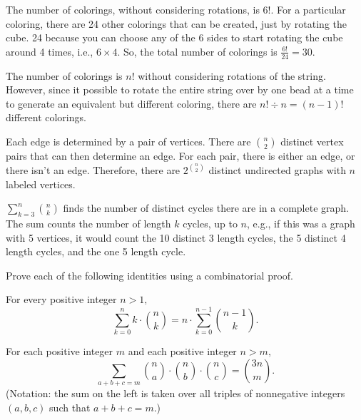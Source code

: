 \documentclass[11pt]{article}
\begin{document}
\begin{solution}
    \begin{Parts}

        \Part The number of colorings, without considering rotations, is $6!$. 
        For a particular coloring, there are 24 other colorings that can be 
        created, just by rotating the cube. 24 because you can choose any of the 
        6 sides to start rotating the cube around 4 times, i.e., $6 \times 4$. So,
        the total number of colorings is $\frac{6!}{24} = 30$.

        \Part The number of colorings is $n!$ without considering rotations of the
        string. However, since it possible to rotate the entire string over by one 
        bead at a time to generate an equivalent but different coloring, there are $n!
        \div n = (n-1)!$ different colorings.

        \Part Each edge is determined by a pair of vertices. There are 
        $\binom{n}{2}$ distinct vertex pairs that can then determine an edge. For 
        each pair, there is either an edge, or there isn't an edge. Therefore,
        there are $2^{\binom{n}{2}}$ distinct undirected graphs with $n$ labeled
        vertices. 

        \Part $\sum_{k=3}^{n} \binom{n}{k}$ finds the number of distinct cycles there 
        are in a complete graph. The sum counts the number of length $k$ cycles, 
        up to $n$, e.g., if this was a graph with 5 vertices, it would count the 10
        distinct 3 length cycles, the 5 distinct 4 length cycles, and the one 5 length
        cycle. 

    \end{Parts}
\end{solution}

Prove each of the following identities using a combinatorial proof.

\begin{Parts}

\Part For every positive integer $n>1,$ 
\[\sum_{k=0}^n k \cdot \binom{n}{k} = n\cdot \sum_{k=0}^{n - 1}\binom{n - 1}{k}.\]

\Part For each positive integer $m$ and each positive integer $n > m,$
\[\sum_{a + b + c = m} \binom{n}{a}\cdot\binom{n}{b}\cdot\binom{n}{c} = \binom{3n}{m}.\]
(Notation: the sum on the left is taken over all triples of nonnegative integers 
$(a,b,c)$ such that $a + b + c = m.$)

\end{Parts}
\end{document}
